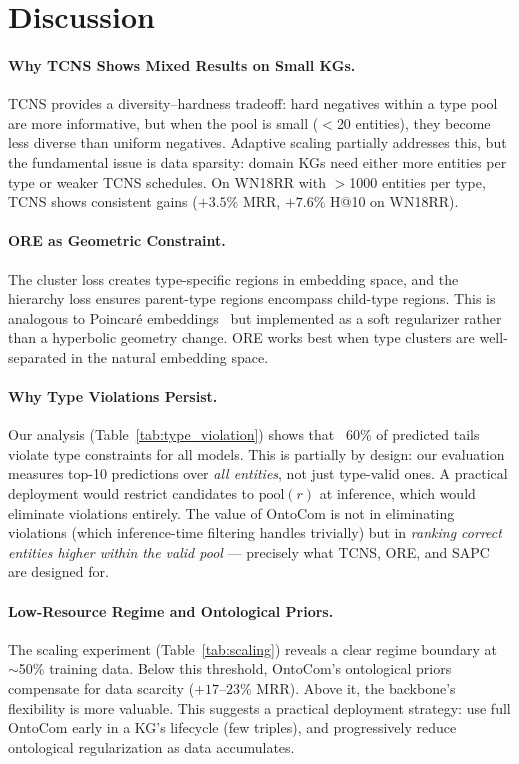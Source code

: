 \documentclass[10pt,twocolumn]{article}
\begin{document}
\section{Discussion}

\paragraph{Why TCNS Shows Mixed Results on Small KGs.}
TCNS provides a diversity--hardness tradeoff: hard negatives within a type pool
are more informative, but when the pool is small ($<$20 entities), they become
less diverse than uniform negatives. Adaptive scaling partially addresses this,
but the fundamental issue is data sparsity: domain KGs need either more entities
per type or weaker TCNS schedules. On WN18RR with $>$1000 entities per type,
TCNS shows consistent gains ($+3.5\%$ MRR, $+7.6\%$ H@10 on WN18RR).

\paragraph{ORE as Geometric Constraint.}
The cluster loss creates type-specific regions in embedding space, and the
hierarchy loss ensures parent-type regions encompass child-type regions.
This is analogous to Poincaré embeddings~\cite{nickel2017poincare} but implemented
as a soft regularizer rather than a hyperbolic geometry change. ORE works best
when type clusters are well-separated in the natural embedding space.

\paragraph{Why Type Violations Persist.}
Our analysis (Table~\ref{tab:type_violation}) shows that ~60\% of predicted
tails violate type constraints for all models. This is partially by design:
our evaluation measures top-10 predictions over \emph{all entities}, not
just type-valid ones. A practical deployment would restrict candidates to
$\text{pool}(r)$ at inference, which would eliminate violations entirely.
The value of OntoCom is not in eliminating violations (which inference-time
filtering handles trivially) but in \emph{ranking correct entities higher
within the valid pool} --- precisely what TCNS, ORE, and SAPC are designed for.

\paragraph{Low-Resource Regime and Ontological Priors.}
The scaling experiment (Table~\ref{tab:scaling}) reveals a clear regime boundary
at $\sim$50\% training data. Below this threshold, OntoCom's ontological
priors compensate for data scarcity ($+17$--$23\%$ MRR). Above it, the
backbone's flexibility is more valuable. This suggests a practical deployment
strategy: use full OntoCom early in a KG's lifecycle (few triples), and
progressively reduce ontological regularization as data accumulates.
\end{document}
